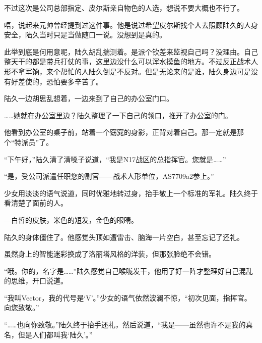 不过这次是公司总部指定、皮尔斯亲自物色的人选，想说不要大概也不行了。

唔，说起来元帅曾经提到过这件事。他是说过希望皮尔斯找个人去照顾陆久的人身安全，陆久当时只是当做随口一说。没想到是真的。

此举到底是何用意呢，陆久胡乱揣测着。是派个钦差来监视自己吗？没理由。自己整天干的都是带兵打仗的事，这里边没什么可以浑水摸鱼的地方。不过反正战术人形不拿军饷，来个帮忙的人陆久倒是不反对。但是无论来的是谁，陆久身边可是没有好差使的，恐怕要多辛苦了。

陆久一边胡思乱想着，一边来到了自己的办公室门口。

……她就在办公室里边？陆久整理了一下自己的领口，推开了办公室的门。

他看到办公室的桌子前，站着一个窈窕的身影，正背对着自己。那一定就是那个“特派员”了。

“下午好，”陆久清了清嗓子说道，“我是N17战区的总指挥官。您就是……”

“是，受公司派遣任职您的副官——战术人形单位，AS7709a2参上。”

少女用淡淡的语气说道，同时优雅地转过身，抬手敬上一个标准的军礼。陆久终于看清楚了面前的人。

---白皙的皮肤，米色的短发，金色的眼睛。

陆久的身体僵住了。他感觉头顶如遭雷击、脑海一片空白，甚至忘记了还礼。

虽然身上的智能迷彩换成了洛丽塔风格的洋装，但那张脸绝不会错。

“哦。你的，名字是……”陆久感觉自己喉咙发干，他用了好一阵才整理好自己混乱的思维，开口说道。

“我叫Vector，我的代号是‘V’。”少女的语气依然波澜不惊，“初次见面，指挥官。向您致敬。”

“……也向你致敬。”陆久终于抬手还礼，然后说道，“我是——虽然也许不是我的真名，但是人们都叫我‘陆久’。”

